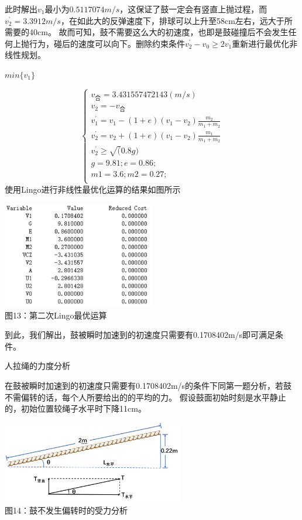 \documentclass[UTF8]{article}
\begin{document}
此时解出$v_1最小为0.5117074m/s$，这保证了鼓一定会有竖直上抛过程，而$v_2^{\mbox{'}}=3.3912m/s$，在如此大的反弹速度下，排球可以上升至58cm左右，远大于所需要的40cm。
故而可知，鼓不需要这么大的初速度，也即是鼓碰撞后不会发生任何上抛行为，碰后的速度可以向下。删除约束条件$v_2^{\mbox{'}}-v_0\ge 2v_1^{\mbox{'}}$重新进行最优化非线性规划。

\begin{center}
    $min \{ v_1 \}$    
\end{center}
\begin{equation}
    \begin{cases}
        v_{\mbox{合}}=3.431557472143(m/s)\\
        v_2=-v_{\mbox{合}}\\
        v_1^{\mbox{'}}=v_1-(1+e)(v_1-v_2)\frac{m_2}{m_1+m_2}\\
        v_2^{\mbox{'}}=v_2+(1+e)(v_1-v_2)\frac{m_1}{m_1+m_2}\\
        v_2^{\mbox{'}}\ge\sqrt(0.8g)\\
        g=9.81; e=0.86; \\
        m1=3.6; m2=0.27;\\
    \end{cases}
\end{equation}
使用Lingo进行非线性最优化运算的结果如图所示

\begin{center}
    \includegraphics[width=0.5\textwidth]{figure9.png}\\ 
    图13：第二次Lingo最优运算
\end{center}

到此，我们解出，鼓被瞬时加速到的初速度只需要有0.1708402m/s即可满足条件。\\

\centerline{人拉绳的力度分析}

在鼓被瞬时加速到的初速度只需要有0.1708402m/s的条件下同第一题分析，若鼓不需偏转的话，每个人所要给出的的平均的力。
假设鼓面初始时刻是水平静止的，初始位置较绳子水平时下降11cm。

\begin{center}
    \includegraphics[width=0.6\textwidth]{figure10.png}\\ 
    图14：鼓不发生偏转时的受力分析
\end{center}
\end{document}
